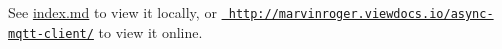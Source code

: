 \label{index_md_lib_async_mqtt_client_master_docs_README}%
%


See \mbox{\hyperlink{md_lib_async_mqtt_client_master_docs_index}{index.md}} to view it locally, or \href{http://marvinroger.viewdocs.io/async-mqtt-client/}{\texttt{ http\+://marvinroger.\+viewdocs.\+io/async-\/mqtt-\/client/}} to view it online. 